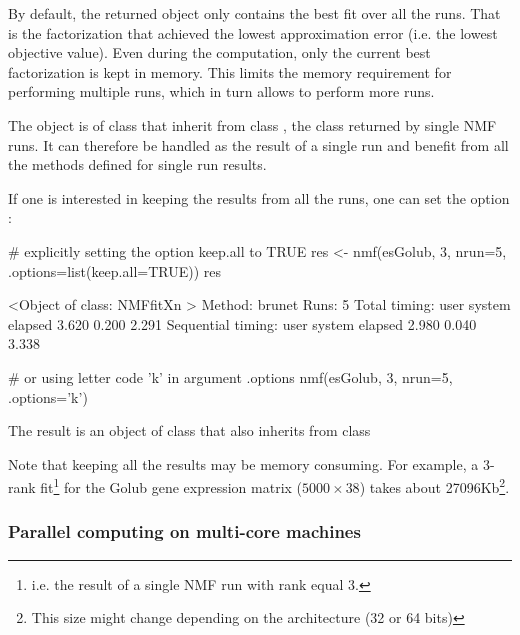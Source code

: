 \documentclass[a4paper]{article}
\begin{document}
By default, the returned object only contains the best fit over all the runs.
That is the factorization that achieved the lowest approximation error 
(i.e. the lowest objective value).
Even during the computation, only the current best factorization is kept in memory.
This limits the memory requirement for performing multiple runs, which in turn 
allows to perform more runs.

The object  is of class  that inherit from class , the 
class returned by single NMF runs. 
It can therefore be handled as the result of a single run and benefit from all the methods defined for single run results.

\medskip
If one is interested in keeping the results from all the runs, one can 
set the option :

\begin{Schunk}
\begin{Sinput}
 # explicitly setting the option keep.all to TRUE
 res <- nmf(esGolub, 3, nrun=5, .options=list(keep.all=TRUE))
 res
\end{Sinput}
\begin{Soutput}
<Object of class: NMFfitXn >
  Method: brunet 
  Runs:  5 
  Total timing:
   user  system elapsed 
  3.620   0.200   2.291 
  Sequential timing:
   user  system elapsed 
  2.980   0.040   3.338 
\end{Soutput}
\end{Schunk}

\begin{Schunk}
\begin{Sinput}
 # or using letter code 'k' in argument .options
 nmf(esGolub, 3, nrun=5, .options='k')
\end{Sinput}
\end{Schunk}

The result is an object of class  that also inherits from class 

Note that keeping all the results may be memory consuming. For example, 
a 3-rank  fit\footnote{i.e. the result of a single NMF run with 
rank equal 3.} for the Golub gene expression matrix ($5000 \times 38$) 
takes about 27096Kb\footnote{This size might change depending on the architecture (32 or 64 bits)}.

\subsubsection{Parallel computing on multi-core machines}\label{multicore}
\end{document}
